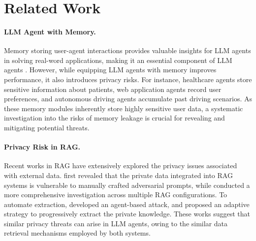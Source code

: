 \section{Related Work}
\paragraph{LLM Agent with Memory.}
Memory storing user-agent interactions provides valuable insights for LLM agents in solving real-word applications, making it an essential component of LLM agents \cite{survey_agent_memory}. 
However, while equipping LLM agents with memory improves performance, it also introduces privacy risks. 
For instance, healthcare agents \cite{EHRAgent_shi_emnlp24,chatdoctor_li_23} store sensitive information about patients, web application agents \cite{RAP_kagaya_24} record user preferences, and autonomous driving agents \cite{AgentDriver_mao_colm24,DiLu_autodriving_wen_iclr24} accumulate past driving scenarios. 
As these memory modules inherently store highly sensitive user data, a systematic investigation into the risks of memory leakage is crucial for revealing and mitigating potential threats. 



\vspace{-6pt}
\paragraph{Privacy Risk in RAG.}
Recent works in RAG have extensively explored the privacy issues associated with external data. 
\citet{RAG-privacy_zeng_ACL24} first revealed that the private data integrated into RAG systems is vulnerable to manually crafted adversarial prompts, while \citet{RAG_privacy_qi_24} conducted a more comprehensive investigation across multiple RAG configurations. 
To automate extraction, \citet{RAG_thief_jiang_24} developed an agent-based attack, and \citet{RAG_privacy_Maio_24} proposed an adaptive strategy to progressively extract the private knowledge. 
These works suggest that similar privacy threats can arise in LLM agents, owing to the similar data retrieval mechanisms employed by both systems.